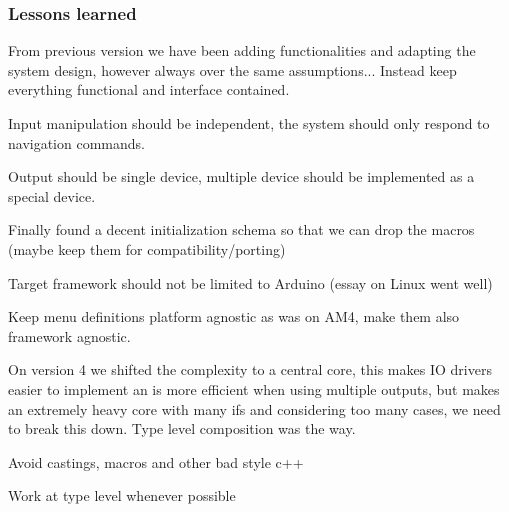 \subsubsection*{Lessons learned}

From previous version we have been adding functionalities and adapting the system design, however always over the same assumptions... Instead keep everything functional and interface contained.

Input manipulation should be independent, the system should only respond to navigation commands.

Output should be single device, multiple device should be implemented as a special device.

Finally found a decent initialization schema so that we can drop the macros (maybe keep them for compatibility/porting)

Target framework should not be limited to Arduino (essay on Linux went well)

Keep menu definitions platform agnostic as was on A\+M4, make them also framework agnostic.

On version 4 we shifted the complexity to a central core, this makes IO drivers easier to implement an is more efficient when using multiple outputs, but makes an extremely heavy core with many if\textquotesingle{}s and considering too many cases, we need to break this down. Type level composition was the way.

Avoid castings, macros and other bad style c++

Work at type level whenever possible 